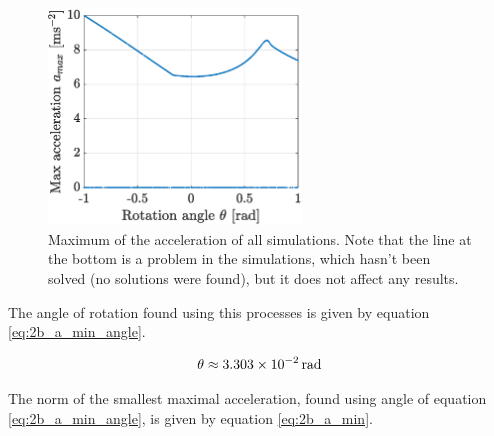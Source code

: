 \documentclass[a4paper,12pt,twoside]{article}
\begin{document}
\begin{figure}[h]
  \centering
  \includegraphics[width=0.6\textwidth]{graphs/ex5b_maxaccel.eps}
  \caption{Maximum of the acceleration of all simulations. Note that the line at the bottom is a problem in the simulations, which hasn't been solved (no solutions were found), but it does not affect any results.}
  \label{fig:ex5b_maxaccel}
\end{figure}


The angle of rotation found using this processes is given by equation \eqref{eq:2b_a_min_angle}.

\begin{equation}
  \theta \approx \SI{3.303d-2}{\radian}
  \label{eq:2b_a_min_angle}
\end{equation}

The norm of the smallest maximal acceleration, found using angle of equation \eqref{eq:2b_a_min_angle}, is given by equation \eqref{eq:2b_a_min}.
\end{document}
